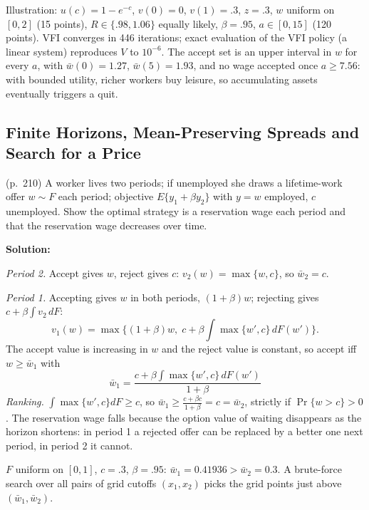 \documentclass[12pt, letterpaper]{article}
\newcommand{\wb}{\bar w}
\begin{document}
\begin{tcolorbox}[oddbox,title={Exercise 6.13 \quad Search and Asset Accumulation}]
\begin{tcolorbox}[databox]
Illustration: $u(c)=1-e^{-c}$, $v(0)=0$, $v(1)=.3$, $z=.3$, $w$ uniform on $[0,2]$ (15 points),
$R\in\{.98,1.06\}$ equally likely, $\beta=.95$, $a\in[0,15]$ (120 points). VFI converges in 446 iterations;
exact evaluation of the VFI policy (a linear system) reproduces $V$ to $10^{-6}$. The accept set is an
upper interval in $w$ for every $a$, with $\wb(0)=1.27$, $\wb(5)=1.93$, and no wage accepted once
$a\ge7.56$: with bounded utility, richer workers buy leisure, so accumulating assets eventually triggers
a quit.
\end{tcolorbox}
\end{tcolorbox}

\subsection{Finite Horizons, Mean-Preserving Spreads and Search for a Price}

\begin{tcolorbox}[oddbox,title={Exercise 6.9 \quad Search with a Finite Horizon}]
\begin{tcolorbox}[questionbox]
(p.~210) A worker lives two periods; if unemployed she draws a lifetime-work offer $w\sim F$ each period;
objective $E\{y_1+\beta y_2\}$ with $y=w$ employed, $c$ unemployed. Show the optimal strategy is a
reservation wage each period and that the reservation wage decreases over time.
\end{tcolorbox}

\textbf{Solution:}

\emph{Period 2.} Accept gives $w$, reject gives $c$: $v_2(w)=\max\{w,c\}$, so $\wb_2=c$.

\emph{Period 1.} Accepting gives $w$ in both periods, $(1+\beta)w$; rejecting gives $c+\beta\int v_2\,dF$:
\[
v_1(w)=\max\Big\{(1+\beta)w,\;c+\beta\int\max\{w',c\}\,dF(w')\Big\}.
\]
The accept value is increasing in $w$ and the reject value is constant, so accept iff $w\ge\wb_1$ with
\[
\boxed{\wb_1=\frac{c+\beta\int\max\{w',c\}\,dF(w')}{1+\beta}}
\]
\emph{Ranking.} $\int\max\{w',c\}dF\ge c$, so $\wb_1\ge\frac{c+\beta c}{1+\beta}=c=\wb_2$, strictly if
$\Pr\{w>c\}>0$. The reservation wage falls because the option value of waiting disappears as the horizon
shortens: in period 1 a rejected offer can be replaced by a better one next period, in period 2 it cannot.

\begin{tcolorbox}[databox]
$F$ uniform on $[0,1]$, $c=.3$, $\beta=.95$: $\wb_1=0.41936>\wb_2=0.3$. A brute-force search over all pairs of
grid cutoffs $(x_1,x_2)$ picks the grid points just above $(\wb_1,\wb_2)$.
\end{tcolorbox}
\end{tcolorbox}
\end{document}
